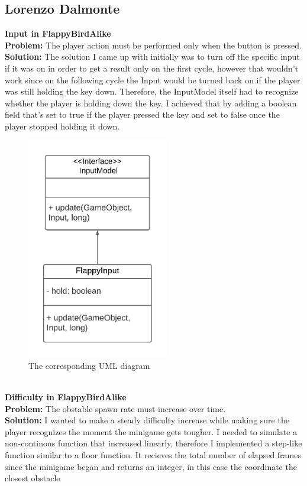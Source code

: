 \documentclass[a4paper,12pt]{report}
\begin{document}
\subsection*{Lorenzo Dalmonte}
\textbf{Input in FlappyBirdAlike}\\
\textbf{Problem:} The player action must be performed only when the button is pressed.\\
\textbf{Solution:} The solution I came up with initially was to turn off the specific input if it was on in order to get a result only on the first cycle,
however that wouldn't work since on the following cycle the Input would be turned back on if the player was still holding the key down.
Therefore, the InputModel itself had to recognize whether the player is holding down the key. I achieved that by adding a boolean field that's set to true
if the player pressed the key and set to false once the player stopped holding it down.
\begin{figure}[ht]
	\centering
	\includegraphics[width=175pt]{res/FlappyInput.pdf}
	\caption{The corresponding UML diagram}
\end{figure}
\pagebreak\\
\textbf{Difficulty in FlappyBirdAlike}\\
\textbf{Problem:} The obstable spawn rate must increase over time.\\
\textbf{Solution:} I wanted to make a steady difficulty increase while making sure the player recognizes the moment the minigame gets tougher.
I needed to simulate a non-continous function that increased linearly, therefore I implemented a step-like function similar to a floor function.
It recieves the total number of elapsed frames since the minigame began and returns an integer, in this case the coordinate the closest obstacle
\end{document}
